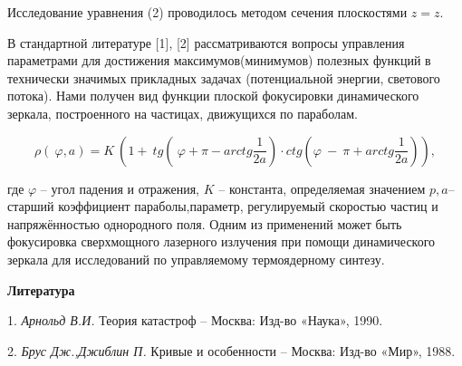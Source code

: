 Исследование уравнения (2) проводилось методом сечения плоскостями $z=z$.

В стандартной литературе [1], [2] рассматриваются вопросы управления параметрами для достижения максимумов(минимумов) полезных функций в технически значимых прикладных задачах (потенциальной энергии, светового потока). Нами получен вид функции плоской фокусировки динамического зеркала, построенного на частицах, движущихся по параболам.

\[\rho (\ \varphi ,a)=K\ \left(1+\ tg\left(\ \varphi +\pi -arctg\frac{1}{2a}\right)\cdot ctg\left(\varphi \ -\ \pi +arctg\frac{1}{2a}\right)\right),\]

где  $\varphi $ -- угол падения и отражения, $K$ -- константа, определяемая значением $p,a$-- старший коэффициент параболы,параметр, регулируемый скоростью частиц и напряжённостью  однородного поля. Одним из применений может быть фокусировка сверхмощного лазерного излучения при помощи динамического зеркала для исследований по управляемому термоядерному синтезу.



\smallskip \centerline{\bf Литература}\nopagebreak

1. {\it Арнольд В.И.} Теория катастроф -- Москва: Изд-во «Наука», 1990.

2. {\it Брус Дж.,Джиблин П.} Кривые и особенности -- Москва: Изд-во «Мир», 1988.



